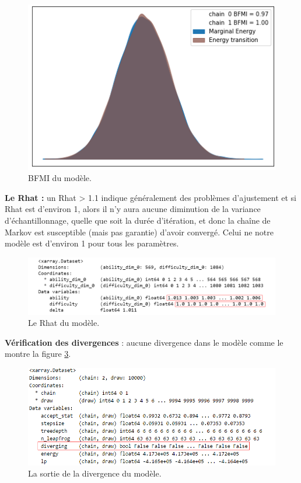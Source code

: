\begin{figure}[H]
	\begin{center}
		\includegraphics[scale=0.5]{images/chapitre7/model_energy.png}
	\end{center}
	\caption{BFMI du modèle.}
	\label{bfmi_of_model}
\end{figure}

\textbf{Le Rhat :} un Rhat > 1.1 indique généralement des problèmes d'ajustement et si Rhat est d'environ 1, alors il n’y aura aucune diminution de la variance d'échantillonnage, quelle que soit la durée d’itération, et donc la chaîne de Markov est susceptible (mais pas garantie) d'avoir convergé. Celui ne notre modèle est d'environ 1 pour tous les paramètres.

\begin{figure}[H]
	\begin{center}
		\includegraphics[width=\textwidth]{images/chapitre7/output_of_rhat.png}
	\end{center}
	\caption{Le Rhat du modèle.}
	\label{output_of_rhat}
\end{figure}
\textbf{Vérification des divergences }: aucune divergence dans le modèle comme le montre la figure \ref{diverging_output}.

\begin{figure}[H]
	\begin{center}
		\includegraphics[width=\textwidth]{images/chapitre7/diverging_output.png}
	\end{center}
	\caption{La sortie de la divergence du modèle.}
	\label{diverging_output}
\end{figure}

